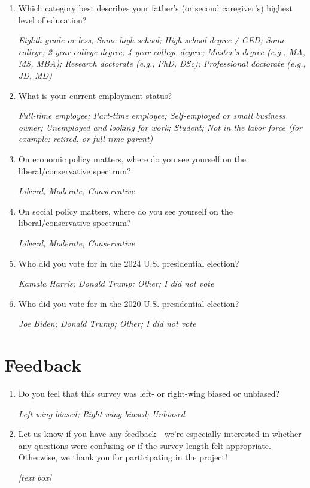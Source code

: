 \documentclass[11pt, headsepline]{article}
\begin{document}
\begin{enumerate}[resume]
    \item Which category best describes your father's (or second caregiver's) highest level of education?

    \textit{Eighth grade or less; Some high school; High school degree / GED; Some college; 2-year college degree; 4-year college degree; Master’s degree (e.g., MA, MS, MBA); Research doctorate (e.g., PhD, DSc); Professional doctorate (e.g., JD, MD)}

    \item What is your current employment status?

    \textit{Full-time employee; Part-time employee; Self-employed or small business owner; Unemployed and looking for work; Student; Not in the labor force (for example: retired, or full-time parent)}

    \item On economic policy matters, where do you see yourself on the liberal/conservative spectrum?
    
    \textit{Liberal; Moderate; Conservative}

    \item On social policy matters, where do you see yourself on the liberal/conservative spectrum?
    
    \textit{Liberal; Moderate; Conservative}

    \item Who did you vote for in the 2024 U.S. presidential election?

    \textit{Kamala Harris; Donald Trump; Other; I did not vote}

    \item Who did you vote for in the 2020 U.S. presidential election?

    \textit{Joe Biden; Donald Trump; Other; I did not vote}

\end{enumerate}

\section*{Feedback}

\begin{enumerate}[resume]

    \item Do you feel that this survey was left- or right-wing biased or unbiased?

    \textit{Left-wing biased; Right-wing biased; Unbiased}

    \item Let us know if you have any feedback—we're especially interested in whether any questions were confusing or if the survey length felt appropriate. Otherwise, we thank you for participating in the project!

    \textit{[text box]}
    
\end{enumerate}

\newpage


\end{document}
